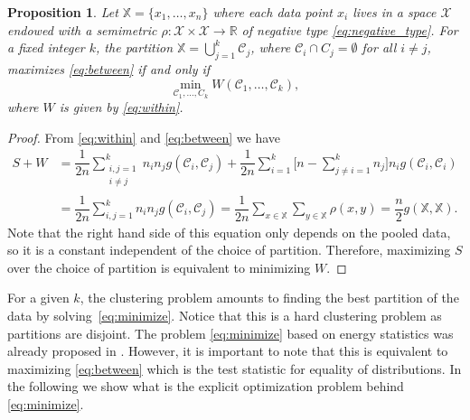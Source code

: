 \documentclass[aps,preprint,nofootinbib,floatfix]{revtex4-1}
\newtheorem{proposition}[theorem]{Proposition}
\newcommand\C{{\mathcal{C}}}
\begin{document}
\begin{proposition}
\label{th:minimize}
Let $\mathbb{X} = \{x_1,\dotsc,x_n\}$ where each data point
$x_i$ lives in a space $\mathcal{X}$ endowed with a semimetric $\rho:
\mathcal{X}\times\mathcal{X} \to \mathbb{R}$ of
negative type \eqref{eq:negative_type}. For a fixed integer $k$,
the partition
$\mathbb{X} = \bigcup_{j=1}^k \C_j$, where $\C_i \cap C_j = \emptyset$ for
all $i\ne j$, maximizes \eqref{eq:between} if and only if
\begin{equation}
\label{eq:minimize}
\min_{\C_1,\dotsc,C_k  } W(
\C_1, \dotsc, \C_k),
\end{equation}
where $W$ is given by \eqref{eq:within}.
\end{proposition}
\begin{proof}
From \eqref{eq:within} and \eqref{eq:between}
we have
\begin{equation}
\begin{split}
S + W &= 
\dfrac{1}{2n} \sum_{\substack{i,j=1 \\ i\ne j}}^k n_i n_j g(\C_i, \C_j)
+ \dfrac{1}{2n} \sum_{i=1}^{k} 
\bigg[ n - 
\sum_{j\ne i = 1}^k n_j \bigg] 
n_i g(\C_i, \C_i) 
\\
& = \dfrac{1}{2n} \sum_{i,j=1}^k n_i n_j g(\C_i, \C_j)
= \dfrac{1}{2n} \sum_{x \in \mathbb{X}} \sum_{y \in \mathbb{X}} \rho(x,y)
= \dfrac{n}{2} g(\mathbb{X}, \mathbb{X}).
\end{split}
\end{equation}
Note that the right hand side of this equation 
only depends on the pooled data, so it is a constant
independent of the choice of partition. Therefore, maximizing
$S$ over the choice of partition is equivalent to minimizing $W$.
\end{proof}

For a given $k$, the clustering problem amounts to
finding the best partition of the data by solving~\eqref{eq:minimize}.
Notice that this is a hard clustering problem as partitions
are disjoint. The problem \eqref{eq:minimize} based on
energy statistics was already proposed in \cite{Kgroups}. However, it is
important to note that this is equivalent to maximizing \eqref{eq:between}
which is the test statistic for equality of distributions. In the following
we show what is the explicit optimization problem behind \eqref{eq:minimize}.
\end{document}
